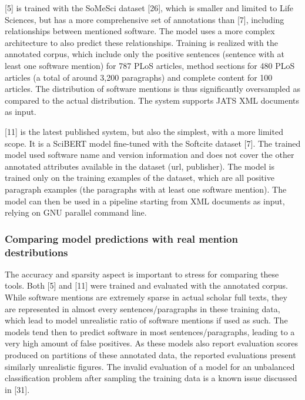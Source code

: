 \documentclass[
]{article}
\begin{document}
{[}5{]} is trained with the SoMeSci dataset {[}26{]}, which is smaller
and limited to Life Sciences, but has a more comprehensive set of
annotations than {[}7{]}, including relationships between mentioned
software. The model uses a more complex architecture to also predict
these relationships. Training is realized with the annotated corpus,
which include only the positive sentences (sentence with at least one
software mention) for 787 PLoS articles, method sections for 480 PLoS
articles (a total of around 3,200 paragraphs) and complete content for
100 articles. The distribution of software mentions is thus
significantly oversampled as compared to the actual distribution. The
system supports JATS XML documents as input.

{[}11{]} is the latest published system, but also the simplest, with a
more limited scope. It is a SciBERT model fine-tuned with the Softcite
dataset {[}7{]}. The trained model used software name and version
information and does not cover the other annotated attributes available
in the dataset (url, publisher). The model is trained only on the
training examples of the dataset, which are all positive paragraph
examples (the paragraphs with at least one software mention). The model
can then be used in a pipeline starting from XML documents as input,
relying on GNU parallel command line.

\hypertarget{comparing-model-predictions-with-real-mention-destributions}{%
\subsubsection{Comparing model predictions with real mention
destributions}\label{comparing-model-predictions-with-real-mention-destributions}}

The accuracy and sparsity aspect is important to stress for comparing
these tools. Both {[}5{]} and {[}11{]} were trained and evaluated with
the annotated corpus. While software mentions are extremely sparse in
actual scholar full texts, they are represented in almost every
sentences/paragraphs in these training data, which lead to model
unrealistic ratio of software mentions if used as such. The models tend
then to predict software in most sentences/paragraphs, leading to a very
high amount of false positives. As these models also report evaluation
scores produced on partitions of these annotated data, the reported
evaluations present similarly unrealistic figures. The invalid
evaluation of a model for an unbalanced classification problem after
sampling the training data is a known issue discussed in {[}31{]}.
\end{document}
